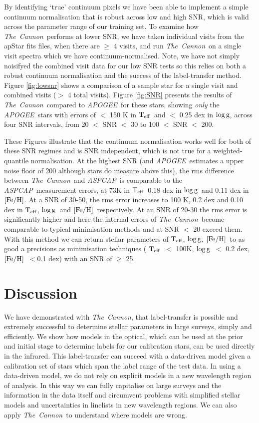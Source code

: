 \documentclass[12pt, preprint]{aastex}
\newcommand{\teff}{\mbox{$\rm T_{eff}$}}
\newcommand{\feh}{\mbox{$\rm [Fe/H]$}}
\newcommand{\logg}{\mbox{$\rm \log g$}}
\newcommand{\tc}{\textsl{The~Cannon}}
\newcommand{\apogee}{\textsl{APOGEE}}
\newcommand{\aspcap}{\textsl{ASPCAP}}
\begin{document}


By identifying `true' continuum pixels we have been able to implement a simple continuum normalisation that is robust across low and high SNR, which is valid across the parameter range of our training set. To examine how \tc\ performs at lower SNR, we have taken individual visits from the apStar fits files, when there are $\ge$ 4 visits, and run \tc\ on a single visit spectra which we have continuum-normalised. Note, we have not simply noisifyed the combined visit data for our low SNR tests so this relies on both a robust continuum normalisation and the success of the label-transfer method. Figure \ref{fig:lowsnr} shows a comparison of a sample star for a single visit and combined visits ($>$ 4 total visits). Figure \ref{fig:SNR} presents the results of \tc\ compared to \apogee\ for these stars, showing \textit{only} the \apogee\ stars with errors of $<$ 150 K in \teff\ and $<$ 0.25 dex in \logg, across four SNR intervals, from 20 $<$ SNR $<$ 30 to 100 $<$ SNR $<$ 200. 



These Figures illustrate that the continuum normalisation works well for both of these SNR regimes and is SNR independent, which is not true for a weighted-quantile normalisation. At the highest SNR (and \apogee\ estimates a upper noise floor of 200 although stars do measure above this), the rms difference between \tc\ and \aspcap\ is comparable to the \aspcap\ measurement errors, at 73K in \teff\, 0.18 dex in \logg\ and 0.11 dex in \feh.  At a SNR of 30-50, the rms error increases to 100 K, 0.2 dex and 0.10 dex in \teff, \logg\ and \feh\, respectively. At an SNR of 20-30 the rms error is significantly higher and here the internal errors of \tc\ become comparable to typical minimisation methods and at SNR $<$ 20 exceed them. With this method we can return stellar parameters of \teff, \logg, \feh\ to as good a precisions as minimisation techniques ( \teff\ $<$ 100K, \logg\ $<$ 0.2 dex, \feh\ $< $0.1 dex) with an SNR of $\ge$ 25. 
 



\section{Discussion}

We have demonstrated with \tc,  that label-transfer is possible and extremely successful to determine stellar parameters in large surveys, simply and efficiently. We show how models in the optical, which can be used at the prior and initial stage to determine labels for our calibration stars, can be used directly in the infrared. This label-transfer can succeed with a data-driven model given a calibration set of stars which span the label range of the test data. In using a data-driven model, we do not rely on explicit models in a new wavelength region of analysis. In this way we can fully capitalise on large surveys and the information in the data itself and circumvent problems with simplified stellar models and uncertainties in linelists in new wavelength regions. We can also apply \tc\ to understand where models are wrong.  
\end{document}

